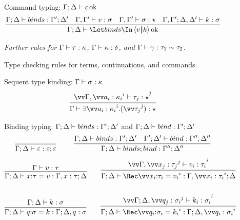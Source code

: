 \documentclass{article}
\begin{document}
\begin{figure}[h]
Command typing: $\Gamma; \Delta \vdash c \operatorname{ok}$
\begin{gather*}
  \infer
  {\Gamma;\Delta \vdash \mcut{\tm}{\ko}{\binds} \Ok}
  {
    \Gamma;\Delta \vdash \binds : \Gamma';\Delta'
    &
    \Gamma,\Gamma' \vdash \tm : \sty
    &
    \Gamma,\Gamma' \vdash \sty : \star
    &
    \Gamma,\Gamma'; \Delta,\Delta' \vdash \ko : \sty
  }
\end{gather*}

\emph{Further rules for $\Gamma \vdash \tau : \kappa$,
  $\Gamma \vdash \kappa : \delta$, and
  $\Gamma \vdash \gamma : \tau_1 \sim \tau_2$.}
\caption{Type checking rules for terms, continuations, and commands}
\label{fig:typing-rules}
\end{figure}

\begin{figure}[h]
\centering
Sequent type kinding: $\Gamma \vdash \sigma : \kappa$
\begin{gather*}
  \infer
  {\Gamma \vdash \stackty{\vect[i]{a_i:\ki_i}}{\vect[j]{\ty_j}} : \star}
  {
    \vect[j]{
      \Gamma, \vect[i]{a_i:\ki_i} \vdash \ty_j : \star
    }
  }
\end{gather*}

Binding typing: $\Gamma; \Delta \vdash binds : \Gamma'; \Delta'$ and
$\Gamma; \Delta \vdash bind : \Gamma'; \Delta'$
\begin{gather*}
  \axiom{\Gamma;\Delta \vdash \mt : \mt;\mt}
  \qquad
  \infer
  {\Gamma;\Delta \vdash \binds; \abind : \Gamma'';\Delta''}
  {
    \Gamma;\Delta \vdash \binds : \Gamma';\Delta'
    &
    \Gamma';\Delta' \vdash \abind : \Gamma'';\Delta''
  }
\end{gather*}
\begin{gather*}
  \infer
  {\Gamma;\Delta \vdash \bind{\ann x \ty}{\tm} : \Gamma,x:\ty;\Delta}
  {\Gamma \vdash \tm : \ty}
  \qquad
  \infer
  {
    \Gamma;\Delta
    \vdash
    \Rec\vect[i]{\bind{\ann{x_i}{\ty_i}}{\tm_i}}
    :
    \Gamma,\vect[i]{x_i:\ty_i};\Delta
  }
  {
    \vect[i]
    {
      \Gamma, \vect[j]{x_j:\ty_j} \vdash \tm_i : \ty_i
    }
  }
  \\\\
  \infer
  {\Gamma;\Delta \vdash \bind{\ann q \sty}{\ko} : \Gamma;\Delta,q:\sty}
  {\Gamma;\Delta \vdash \ko : \sty}
  \qquad
  \infer
  {
    \Gamma;\Delta
    \vdash
    \Rec\vect[i]{\bind{\ann{q_i}{\sty_i}}{\ko_i}}
    :
    \Gamma;\Delta,\vect[i]{q_i:\sty_i}
  }
  {
    \vect[i]
    {
      \Gamma;\Delta,\vect[j]{q_j:\sty_i} \vdash \ko_i : \sty_i
    }
  }  
\end{gather*}


\end{figure}
\end{document}
